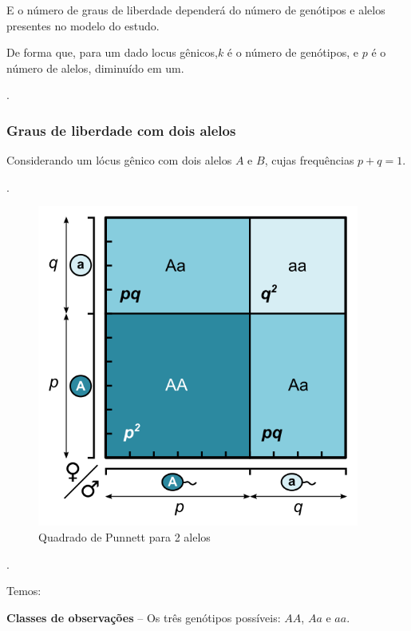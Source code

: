\documentclass[
]{book}
\begin{document}
E o número de graus de liberdade dependerá do número de genótipos e alelos presentes no modelo do estudo.

De forma que, para um dado locus gênicos,\(k\) é o número de genótipos, e \(p\) é o número de alelos, diminuído em um.

.\linebreak

\hypertarget{graus-de-liberdade-com-dois-alelos}{%
\subsubsection{Graus de liberdade com dois alelos}\label{graus-de-liberdade-com-dois-alelos}}

Considerando um lócus gênico com dois alelos \(A\) e \(B\), cujas frequências \(p+q=1\).

.\linebreak

\begin{figure}

{\centering \includegraphics[width=400px]{figs/punnett_2alelles} 

}

\caption{Quadrado de Punnett para 2 alelos}\label{fig:gl2alelos}
\end{figure}

.\linebreak

Temos:

\textbf{Classes de observações} -- Os três genótipos possíveis: \(AA\), \(Aa\) e \(aa\).
\end{document}
